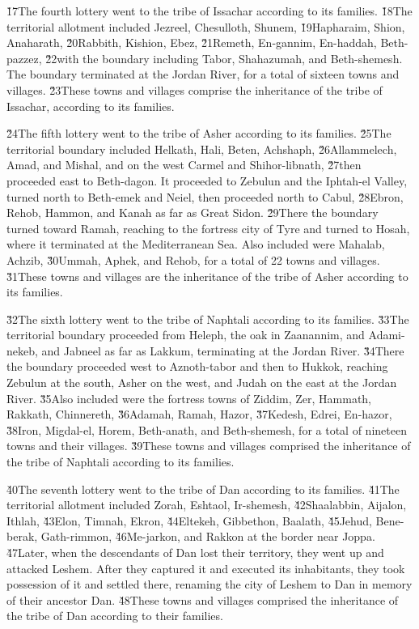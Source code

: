 \v{17}The fourth lottery went to the tribe of Issachar according to its families. \v{18}The territorial allotment included Jezreel, Chesulloth, Shunem, \v{19}Hapharaim, Shion, Anaharath, \v{20}Rabbith, Kishion, Ebez, \v{21}Remeth, En-gannim, En-haddah, Beth-pazzez, \v{22}with the boundary including Tabor, Shahazumah, and Beth-shemesh. The boundary terminated at the Jordan River, for a total of sixteen towns and villages. \v{23}These towns and villages comprise the inheritance of the tribe of Issachar, according to its families.

\v{24}The fifth lottery went to the tribe of Asher according to its families. \v{25}The territorial boundary included Helkath, Hali, Beten, Achshaph, \v{26}Allammelech, Amad, and Mishal, and on the west Carmel and Shihor-libnath, \v{27}then proceeded east to Beth-dagon. It proceeded to Zebulun and the Iphtah-el Valley, turned north to Beth-emek and Neiel, then proceeded north to Cabul, \v{28}Ebron, Rehob, Hammon, and Kanah as far as Great Sidon. \v{29}There the boundary turned toward Ramah, reaching to the fortress city of Tyre and turned to Hosah, where it terminated at the Mediterranean Sea. Also included were Mahalab, Achzib, \v{30}Ummah, Aphek, and Rehob, for a total of 22 towns and villages. \v{31}These towns and villages are the inheritance of the tribe of Asher according to its families.

\v{32}The sixth lottery went to the tribe of Naphtali according to its families. \v{33}The territorial boundary proceeded from Heleph, the oak in Zaanannim, and Adami-nekeb, and Jabneel as far as Lakkum, terminating at the Jordan River. \v{34}There the boundary proceeded west to Aznoth-tabor and then to Hukkok, reaching Zebulun at the south, Asher on the west, and Judah on the east at the Jordan River. \v{35}Also included were the fortress towns of Ziddim, Zer, Hammath, Rakkath, Chinnereth, \v{36}Adamah, Ramah, Hazor, \v{37}Kedesh, Edrei, En-hazor, \v{38}Iron, Migdal-el, Horem, Beth-anath, and Beth-shemesh, for a total of nineteen towns and their villages. \v{39}These towns and villages comprised the inheritance of the tribe of Naphtali according to its families.

\v{40}The seventh lottery went to the tribe of Dan according to its families. \v{41}The territorial allotment included Zorah, Eshtaol, Ir-shemesh, \v{42}Shaalabbin, Aijalon, Ithlah, \v{43}Elon, Timnah, Ekron, \v{44}Eltekeh, Gibbethon, Baalath, \v{45}Jehud, Bene-berak, Gath-rimmon, \v{46}Me-jarkon, and Rakkon at the border near Joppa. \v{47}Later, when the descendants of Dan lost their territory, they went up and attacked Leshem. After they captured it and executed its inhabitants, they took possession of it and settled there, renaming the city of Leshem to Dan in memory of their ancestor Dan. \v{48}These towns and villages comprised the inheritance of the tribe of Dan according to their families.

